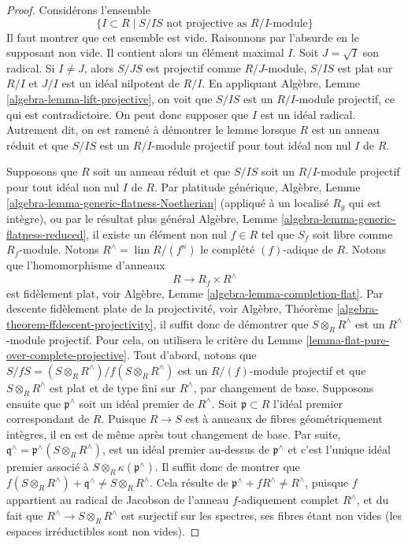 \begin{proof}
Considérons l'ensemble
$$
\{I \subset R \mid S/IS\text{ not projective as }R/I\text{-module}\}
$$
Il faut montrer que cet ensemble est vide. Raisonnons par l'absurde en le supposant
non vide. Il contient alors un élément maximal $I$.
Soit $J = \sqrt{I}$ son radical. Si $I \not = J$, alors
$S/JS$ est projectif comme $R/J$-module, $S/IS$ est plat sur $R/I$
et $J/I$ est un idéal nilpotent de $R/I$. En appliquant
Algèbre, Lemme \ref{algebra-lemma-lift-projective},
on voit que $S/IS$ est un $R/I$-module projectif, ce qui est contradictoire.
On peut donc supposer que $I$ est un idéal radical. Autrement dit, on
est ramené à démontrer le lemme lorsque $R$ est un anneau réduit et que
$S/IS$ est un $R/I$-module projectif pour tout idéal non nul $I$
de $R$.

\medskip\noindent
Supposons que $R$ soit un anneau réduit et que $S/IS$ soit un $R/I$-module projectif
pour tout idéal non nul $I$ de $R$. Par platitude générique,
Algèbre, Lemme \ref{algebra-lemma-generic-flatness-Noetherian}
(appliqué à un localisé $R_g$ qui est intègre), ou par le résultat plus général
Algèbre, Lemme \ref{algebra-lemma-generic-flatness-reduced},
il existe un élément non nul $f \in R$ tel que $S_f$ soit libre comme
$R_f$-module. Notons $R^\wedge = \lim R/(f^n)$ le complété $(f)$-adique
de $R$. Notons que l'homomorphisme d'anneaux
$$
R \longrightarrow R_f \times R^\wedge
$$
est fidèlement plat, voir
Algèbre, Lemme \ref{algebra-lemma-completion-flat}.
Par descente fidèlement plate de la projectivité, voir
Algèbre, Théorème \ref{algebra-theorem-ffdescent-projectivity},
il suffit donc de démontrer que $S \otimes_R R^\wedge$ est un
$R^\wedge$-module projectif. Pour cela, on utilisera le critère du
Lemme \ref{lemma-flat-pure-over-complete-projective}.
Tout d'abord, notons que $S/fS = (S \otimes_R R^\wedge)/f(S \otimes_R R^\wedge)$
est un $R/(f)$-module projectif et que $S \otimes_R R^\wedge$ est plat
et de type fini sur $R^\wedge$, par changement de base.
Supposons ensuite que $\mathfrak p^\wedge$ soit un idéal premier
de $R^\wedge$. Soit $\mathfrak p \subset R$ l'idéal premier correspondant
de $R$. Puisque $R \to S$ est à anneaux de fibres géométriquement intègres,
il en est de même après tout changement de base. Par suite,
$\mathfrak q^\wedge = \mathfrak p^\wedge(S \otimes_R R^\wedge)$,
est un idéal premier au-dessus de $\mathfrak p^\wedge$
et c'est l'unique idéal premier associé à
$S \otimes_R \kappa(\mathfrak p^\wedge)$. Il suffit donc de montrer que
$f(S \otimes_R R^\wedge) + \mathfrak q^\wedge \not = S \otimes_R R^\wedge$.
Cela résulte de $\mathfrak p^\wedge + fR^\wedge \not = R^\wedge$, puisque
$f$ appartient au radical de Jacobson de l'anneau $f$-adiquement complet $R^\wedge$,
et du fait que $R^\wedge \to S \otimes_R R^\wedge$ est surjectif sur les spectres,
ses fibres étant non vides (les espaces irréductibles sont non vides).
\end{proof}

